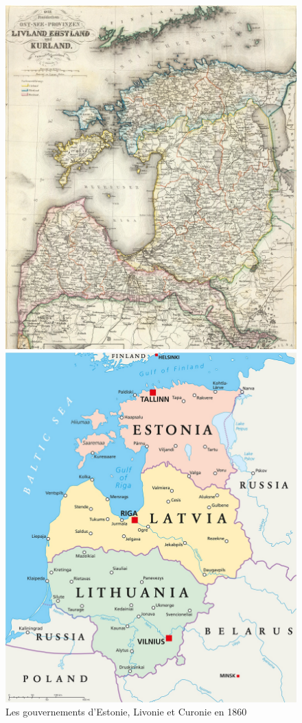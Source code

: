 \documentclass[a4paper,twoside,12pt]{article}
\begin{document}
\begin{figure}[!h]
\begin{minipage}[b]{0.5\textwidth}
    \centering
    \includegraphics[width=0.9\linewidth]{images/provinces.jpg}
    \captionsetup{width=0.9\linewidth}
    \caption{Les gouvernements d’Estonie, Livonie et Curonie en 1860}
    \label{fig:provinces1860}
\end{minipage}
\begin{minipage}[b]{0.5\textwidth}
    \centering
    \includegraphics[width=0.9\linewidth]{images/balticcountries.jpg}

\end{minipage}
\end{figure}
\end{document}
